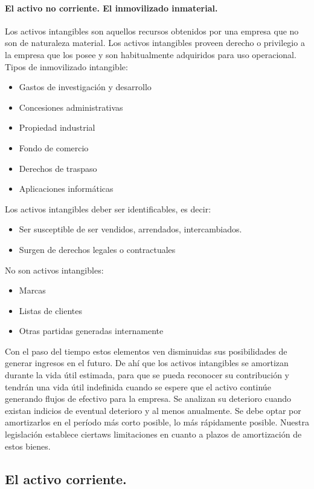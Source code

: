 \paragraph{El activo no corriente. El inmovilizado inmaterial.}
Los activos intangibles son aquellos recursos obtenidos por una empresa que no son de naturaleza material. Los activos intangibles proveen derecho o privilegio a la empresa que los posee y son habitualmente adquiridos para uso operacional. Tipos de inmovilizado intangible:
\begin{itemize}
    \item Gastos de investigación y desarrollo
    \item Concesiones administrativas
    \item Propiedad industrial
    \item Fondo de comercio
    \item Derechos de traspaso
    \item Aplicaciones informáticas
\end{itemize}

Los activos intangibles deber ser identificables, es decir:
\begin{itemize}
    \item Ser susceptible de ser vendidos, arrendados, intercambiados.
    \item Surgen de derechos legales o contractuales
\end{itemize}

No son activos intangibles:
\begin{itemize}
    \item Marcas
    \item Listas de clientes
    \item Otras partidas generadas internamente
\end{itemize}

Con el paso del tiempo estos elementos ven disminuidas sus posibilidades de generar ingresos en el futuro. De ahí que los activos intangibles se amortizan durante la vida útil estimada, para que se pueda reconocer su contribución y tendrán una vida útil indefinida cuando se espere que el activo continúe generando flujos de efectivo para la empresa.
Se analizan su deterioro cuando existan indicios de eventual deterioro y al menos anualmente.
Se debe optar por amortizarlos en el período más corto posible, lo más rápidamente posible. Nuestra legislación establece ciertaws limitaciones en cuanto a plazos de amortización de estos bienes.

\subsection{El activo corriente.}
